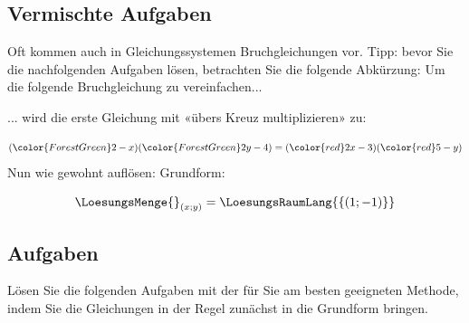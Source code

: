 
\subsection{Vermischte Aufgaben}
Oft kommen auch in Gleichungssystemen Bruchgleichungen vor. Tipp:
bevor Sie die nachfolgenden Aufgaben lösen, betrachten Sie die folgende
Abkürzung: Um die folgende Bruchgleichung zu vereinfachen...

... wird die erste Gleichung mit «übers Kreuz multiplizieren» zu:

$$({\color{ForestGreen}2-x})({\color{ForestGreen}2y-4}) =
({\color{red}2x-3})({\color{red}5-y})$$
Nun wie gewohnt auflösen:
Grundform:



$$\LoesungsMenge{}_{(x;y)} = \LoesungsRaumLang{\{(1; -1)\}}$$


\newpage
\subsection*{Aufgaben}
Lösen Sie die folgenden Aufgaben mit der für Sie am besten geeigneten Methode, indem Sie die
Gleichungen in der Regel zunächst in die Grundform bringen.



\newpage
